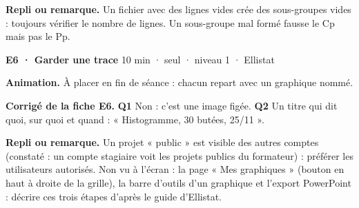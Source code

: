 {\small\textbf{Repli ou remarque.} Un fichier avec des lignes vides crée des sous-groupes vides : toujours vérifier le nombre de lignes. Un sous-groupe mal formé fausse le Cp mais pas le Pp.}\par
\vspace{3pt}
\begin{tcolorbox}[act]\textbf{E6 · Garder une trace} \hfill {\small 10 min · seul · niveau 1 · Ellistat}\end{tcolorbox}
\textbf{Animation.} À placer en fin de séance : chacun repart avec un graphique nommé.\par
\textbf{\color{ok}Corrigé de la fiche E6.} \textbf{Q1} Non : c'est une image figée. \textbf{Q2} Un titre qui dit quoi, sur quoi et quand : « Histogramme, 30 butées, 25/11 ».\par
{\small\textbf{Repli ou remarque.} Un projet « public » est visible des autres comptes (constaté : un compte stagiaire voit les projets publics du formateur) : préférer les utilisateurs autorisés. Non vu à l'écran : la page « Mes graphiques » (bouton en haut à droite de la grille), la barre d'outils d'un graphique et l'export PowerPoint : décrire ces trois étapes d'après le guide d'Ellistat.}\par
\vspace{3pt}
